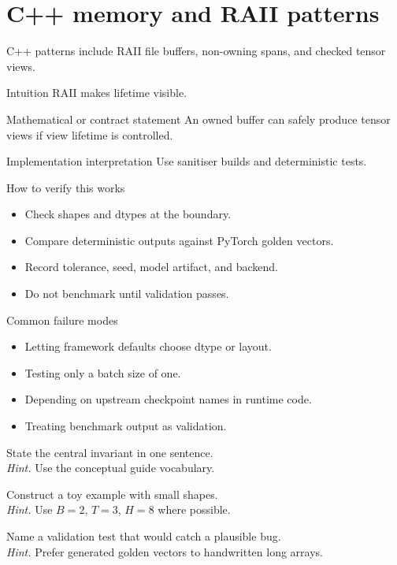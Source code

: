 \chapter{C++ memory and RAII patterns}
\label{app:cpp-patterns}
C++ patterns include RAII file buffers, non-owning spans, and checked tensor views. \citep{cpp2020}



\begin{intuitionbox}{Intuition}
RAII makes lifetime visible.
\end{intuitionbox}

\begin{definitionbox}{Mathematical or contract statement}
An owned buffer can safely produce tensor views if view lifetime is controlled.
\end{definitionbox}

\begin{implementationbox}{Implementation interpretation}
Use sanitiser builds and deterministic tests.
\end{implementationbox}

\begin{verificationbox}{How to verify this works}
\begin{itemize}
\item Check shapes and dtypes at the boundary.
\item Compare deterministic outputs against PyTorch golden vectors.
\item Record tolerance, seed, model artifact, and backend.
\item Do not benchmark until validation passes.
\end{itemize}
\end{verificationbox}

\begin{warningbox}{Common failure modes}
\begin{itemize}
\item Letting framework defaults choose dtype or layout.
\item Testing only a batch size of one.
\item Depending on upstream checkpoint names in runtime code.
\item Treating benchmark output as validation.
\end{itemize}
\end{warningbox}

\begin{chapterexercises}
\item State the central invariant in one sentence.\\
\textit{Hint.} Use the conceptual guide vocabulary.
\item Construct a toy example with small shapes.\\
\textit{Hint.} Use $B=2$, $T=3$, $H=8$ where possible.
\item Name a validation test that would catch a plausible bug.\\
\textit{Hint.} Prefer generated golden vectors to handwritten long arrays.
\end{chapterexercises}

